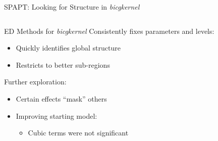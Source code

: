 \documentclass[10pt, compress, aspectratio=169, xcolor={table,usenames,dvipsnames}]{beamer}
\begin{document}
\begin{frame}[label={sec:org142a970}]{SPAPT: Looking for Structure in \emph{bicgkernel}}
\begin{columns}
\begin{column}{0.5\columnwidth}
\begin{block}{ED Methods for \emph{bicgkernel}}
\alert{Consistently} fixes parameters and levels:
\begin{itemize}
\item Quickly identifies \alert{global} structure
\item Restricts to better sub-regions
\end{itemize}

Further exploration:
\begin{itemize}
\item Certain effects ``mask'' others
\item Improving starting model:
\begin{itemize}
\item Cubic terms were not significant
\end{itemize}
\end{itemize}
\end{block}
\end{column}
\begin{column}{0.5\columnwidth}
\end{column}
\end{columns}
\end{frame}
\end{document}
